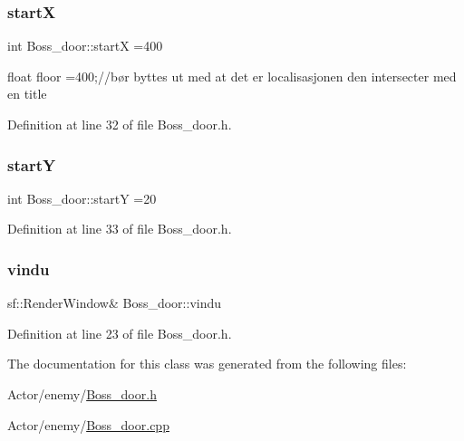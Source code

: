 \subsubsection{\texorpdfstring{startX}{startX}}
{\footnotesize\ttfamily int Boss\+\_\+door\+::startX =400}



float floor =400;//bør byttes ut med at det er localisasjonen den intersecter med en title 



Definition at line 32 of file Boss\+\_\+door.\+h.

\hypertarget{class_boss__door_a617e52e98386b7202fc78a24c4f5037d}{}\label{class_boss__door_a617e52e98386b7202fc78a24c4f5037d} 
\subsubsection{\texorpdfstring{startY}{startY}}
{\footnotesize\ttfamily int Boss\+\_\+door\+::startY =20}



Definition at line 33 of file Boss\+\_\+door.\+h.

\hypertarget{class_boss__door_a41a5f7ad972a57cc11fa7629d4cce412}{}\label{class_boss__door_a41a5f7ad972a57cc11fa7629d4cce412} 
\subsubsection{\texorpdfstring{vindu}{vindu}}
{\footnotesize\ttfamily sf\+::\+Render\+Window\& Boss\+\_\+door\+::vindu}



Definition at line 23 of file Boss\+\_\+door.\+h.



The documentation for this class was generated from the following files\+:\begin{DoxyCompactItemize}
\item 
Actor/enemy/\hyperlink{_boss__door_8h}{Boss\+\_\+door.\+h}\item 
Actor/enemy/\hyperlink{_boss__door_8cpp}{Boss\+\_\+door.\+cpp}\end{DoxyCompactItemize}
